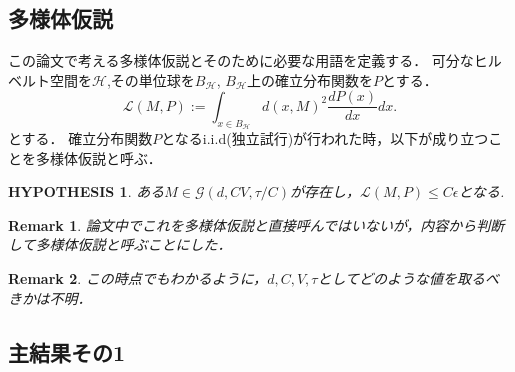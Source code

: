 \documentclass{ujarticle}
\newtheorem*{rem}{Remark}
\newtheorem{hyp}{HYPOTHESIS}
\begin{document}
\subsection{多様体仮説}
\label{sub:多様体仮説}
この論文で考える多様体仮説とそのために必要な用語を定義する．
可分なヒルベルト空間を$\mathcal{H}$,その単位球を$B_{\mathcal{H}}$,
$B_{\mathcal{H}}$上の確立分布関数を$P$とする．
\begin{equation*}
 \mathcal{L}(M,P):=\int_{x \in B_{\mathcal{H}}} d(x,M)^2\frac{dP(x)}{dx}dx.
\end{equation*}
とする．
確立分布関数$P$となるi.i.d(独立試行)が行われた時，以下が成り立つことを多様体仮説と呼ぶ．
\begin{hyp}
  ある$M \in \mathcal{G}(d,CV,\tau/C)$が存在し，$\mathcal{L}(M,P) \le C \epsilon$となる.
\end{hyp}
\begin{rem}
 論文中でこれを多様体仮説と直接呼んではいないが，内容から判断して多様体仮説と呼ぶことにした．
\end{rem}
\begin{rem}
 この時点でもわかるように，$d,C,V,\tau$としてどのような値を取るべきかは不明．
\end{rem}

\subsection{主結果その1}
\label{sub:主結果その1}
\end{document}
